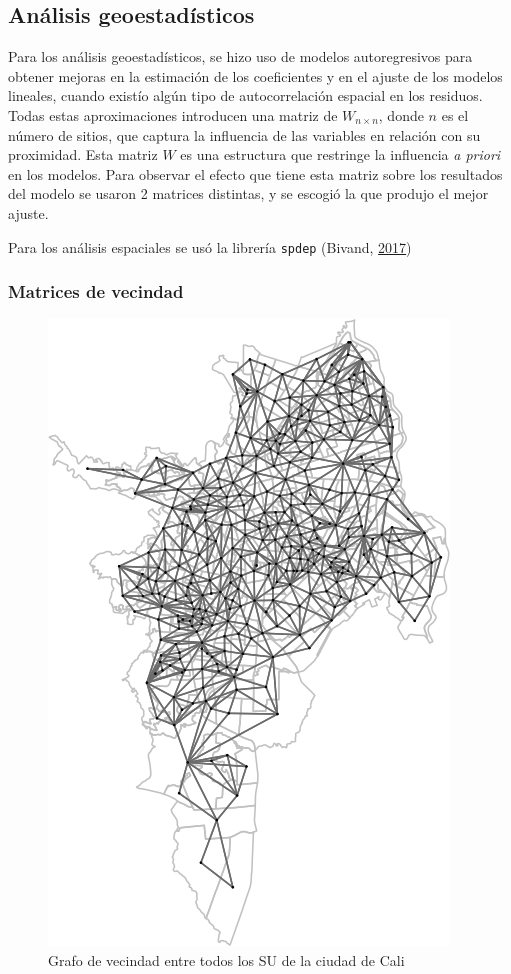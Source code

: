 \documentclass[12pt,a4paper,oneside, openany]{book}
\theoremstyle{definition}
\theoremstyle{definition}
\theoremstyle{definition}
\theoremstyle{remark}
\begin{document}
\subsection{Análisis geoestadísticos}\label{geostat}

Para los análisis geoestadísticos, se hizo uso de modelos autoregresivos
para obtener mejoras en la estimación de los coeficientes y en el ajuste
de los modelos lineales, cuando existío algún tipo de autocorrelación
espacial en los residuos. Todas estas aproximaciones introducen una
matriz de \(W_{n \times n}\), donde \(n\) es el número de sitios, que
captura la influencia de las variables en relación con su proximidad.
Esta matriz \(W\) es una estructura que restringe la influencia \emph{a
priori} en los modelos. Para observar el efecto que tiene esta matriz
sobre los resultados del modelo se usaron 2 matrices distintas, y se
escogió la que produjo el mejor ajuste.

Para los análisis espaciales se usó la librería \texttt{spdep} (Bivand,
\protect\hyperlink{ref-R-spdep}{2017})

\subsubsection{Matrices de vecindad}\label{matrices-de-vecindad}

\begin{figure}[H]

{\centering \includegraphics[width=0.6\linewidth]{tesis-unigis_files/figure-latex/w-su-todos-1} 

}

\caption{Grafo de vecindad entre todos los SU de la ciudad de Cali}\label{fig:w-su-todos}
\end{figure}
\end{document}
